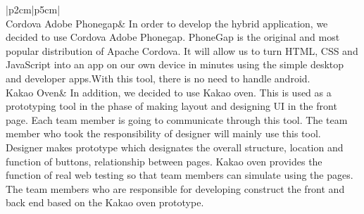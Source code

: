 \documentclass[letterpaper, 10 pt, conference]{ieeeconf}  %
\begin{document}
\begin{supertabular}{ |p{2cm}|p{5cm}|  }
 \hline
  \\
 \hline
 Cordova Adobe Phonegap& In order to develop the hybrid application, we decided to use Cordova Adobe Phonegap. PhoneGap is the original and most popular distribution of Apache Cordova. It will allow us to turn HTML, CSS and JavaScript into an app on our own device in minutes using the simple desktop and developer apps.With this tool, there is no need to handle android. \\
 \hline
 Kakao Oven& In addition, we decided to use Kakao oven. This is used as a prototyping tool in the phase of making layout and designing UI in the front page. Each team member is going to communicate through this tool. The team member who took the responsibility of designer will mainly use this tool. Designer makes prototype which designates the overall structure, location and function of buttons, relationship between pages. Kakao oven provides the function of real web testing so that team members can simulate using the pages. The team members who are responsible for developing construct the front and back end based on the Kakao oven prototype.  \\
 \hline


\end{supertabular}
\end{document}
